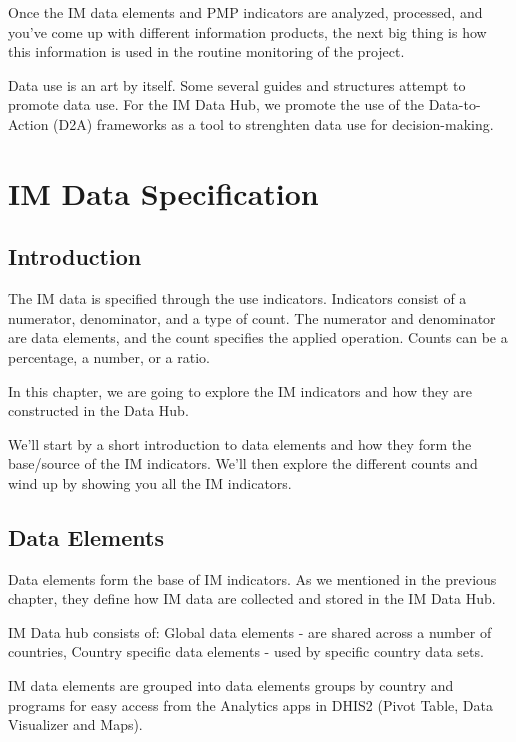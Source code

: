 \documentclass[]{book}
\begin{document}
Once the IM data elements and PMP indicators are analyzed, processed, and you've come up with different information products, the next big thing is how this information is used in the routine monitoring of the project.

Data use is an art by itself. Some several guides and structures attempt to promote data use. For the IM Data Hub, we promote the use of the Data-to-Action (D2A) frameworks as a tool to strenghten data use for decision-making.

\hypertarget{data}{%
\chapter{IM Data Specification}\label{data}}

\hypertarget{introduction-1}{%
\section{Introduction}\label{introduction-1}}

The IM data is specified through the use indicators. Indicators consist of a numerator, denominator, and a type of count. The numerator and denominator are data elements, and the count specifies the applied operation. Counts can be a percentage, a number, or a ratio.

In this chapter, we are going to explore the IM indicators and how they are constructed in the Data Hub.

We'll start by a short introduction to data elements and how they form the base/source of the IM indicators. We'll then explore the different counts and wind up by showing you all the IM indicators.

\hypertarget{data-elements-1}{%
\section{Data Elements}\label{data-elements-1}}

Data elements form the base of IM indicators. As we mentioned in the previous chapter, they define how IM data are collected and stored in the IM Data Hub.

IM Data hub consists of:
Global data elements - are shared across a number of countries,
Country specific data elements - used by specific country data sets.

IM data elements are grouped into data elements groups by country and programs for easy access from the Analytics apps in DHIS2 (Pivot Table, Data Visualizer and Maps).
\end{document}
